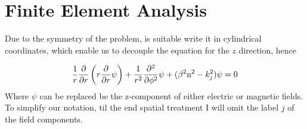 \chapter{Finite Element Analysis}
\label{app:Comsol_Solution}

Due to the symmetry of the problem, is suitable write it in cylindrical coordinates, which enable us to decouple the equation for the $z$ direction, hence

\begin{equation}
    \frac{1}{r}\dfrac{\partial }{\partial r}\left(r \dfrac{\partial  }{\partial r}\psi\right)+\frac{1}{r^2} \dfrac{\partial ^2}{\partial \phi^2}\psi + (\beta^2\text{n}^2-k_j^2)\psi = 0
\end{equation}
Where $\psi$ can be replaced be the z-component of either electric or magnetic fields. To simplify our notation, til the end spatial treatment I will omit the label $j$ of the field components. 
